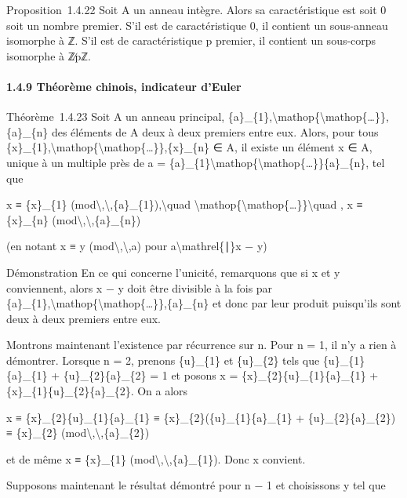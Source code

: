 \documentclass[]{article}
\begin{document}
Proposition~1.4.22 Soit A un anneau intègre. Alors sa caractéristique
est soit 0 soit un nombre premier. S'il est de caractéristique 0, il
contient un sous-anneau isomorphe à ℤ. S'il est de caractéristique p
premier, il contient un sous-corps isomorphe à ℤ∕pℤ.

\paragraph{1.4.9 Théorème chinois, indicateur d'Euler}

Théorème~1.4.23 Soit A un anneau principal,
\{a\}\_\{1\},\textbackslash{}mathop\{\textbackslash{}mathop\{\ldots{}\}\},\{a\}\_\{n\}
des éléments de A deux à deux premiers entre eux. Alors, pour tous
\{x\}\_\{1\},\textbackslash{}mathop\{\textbackslash{}mathop\{\ldots{}\}\},\{x\}\_\{n\}
∈ A, il existe un élément x ∈ A, unique à un multiple près de a =
\{a\}\_\{1\}\textbackslash{}mathop\{\textbackslash{}mathop\{\ldots{}\}\}\{a\}\_\{n\},
tel que

x ≡ \{x\}\_\{1\}
(mod\textbackslash{},\textbackslash{},\{a\}\_\{1\}),\textbackslash{}quad
\textbackslash{}mathop\{\textbackslash{}mathop\{\ldots{}\}\}\textbackslash{}quad
, x ≡ \{x\}\_\{n\} (mod\textbackslash{},\textbackslash{},\{a\}\_\{n\})

(en notant x ≡ y (mod\textbackslash{},\textbackslash{},a) pour
a\textbackslash{}mathrel\{∣\}x − y)

Démonstration En ce qui concerne l'unicité, remarquons que si x et y
conviennent, alors x − y doit être divisible à la fois par
\{a\}\_\{1\},\textbackslash{}mathop\{\textbackslash{}mathop\{\ldots{}\}\},\{a\}\_\{n\}
et donc par leur produit puisqu'ils sont deux à deux premiers entre eux.

Montrons maintenant l'existence par récurrence sur n. Pour n = 1, il n'y
a rien à démontrer. Lorsque n = 2, prenons \{u\}\_\{1\} et \{u\}\_\{2\}
tels que \{u\}\_\{1\}\{a\}\_\{1\} + \{u\}\_\{2\}\{a\}\_\{2\} = 1 et
posons x = \{x\}\_\{2\}\{u\}\_\{1\}\{a\}\_\{1\} +
\{x\}\_\{1\}\{u\}\_\{2\}\{a\}\_\{2\}. On a alors

x ≡ \{x\}\_\{2\}\{u\}\_\{1\}\{a\}\_\{1\} ≡
\{x\}\_\{2\}(\{u\}\_\{1\}\{a\}\_\{1\} + \{u\}\_\{2\}\{a\}\_\{2\}) ≡
\{x\}\_\{2\} (mod\textbackslash{},\textbackslash{},\{a\}\_\{2\})

et de même x ≡ \{x\}\_\{1\}
(mod\textbackslash{},\textbackslash{},\{a\}\_\{1\}). Donc x convient.

Supposons maintenant le résultat démontré pour n − 1 et choisissons y
tel que
\end{document}
